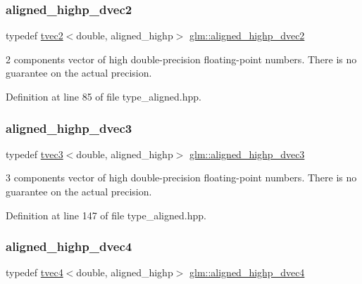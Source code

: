 \subsubsection{\texorpdfstring{aligned\_highp\_dvec2}{aligned\_highp\_dvec2}}
{\footnotesize\ttfamily typedef \mbox{\hyperlink{structglm_1_1tvec2}{tvec2}}$<$double, aligned\+\_\+highp$>$ \mbox{\hyperlink{group__gtc__type__aligned_gaaaaceecde7bb178eebc873836c7e6009}{glm\+::aligned\+\_\+highp\+\_\+dvec2}}}

2 components vector of high double-\/precision floating-\/point numbers. There is no guarantee on the actual precision. 

Definition at line 85 of file type\+\_\+aligned.\+hpp.

\mbox{\label{group__gtc__type__aligned_ga8f0cf063fb87e4bd3a26ec242a71d75d}} 
\subsubsection{\texorpdfstring{aligned\_highp\_dvec3}{aligned\_highp\_dvec3}}
{\footnotesize\ttfamily typedef \mbox{\hyperlink{structglm_1_1tvec3}{tvec3}}$<$double, aligned\+\_\+highp$>$ \mbox{\hyperlink{group__gtc__type__aligned_ga8f0cf063fb87e4bd3a26ec242a71d75d}{glm\+::aligned\+\_\+highp\+\_\+dvec3}}}

3 components vector of high double-\/precision floating-\/point numbers. There is no guarantee on the actual precision. 

Definition at line 147 of file type\+\_\+aligned.\+hpp.

\mbox{\label{group__gtc__type__aligned_ga96f78b78823a228d1ca0cfa3be7e6a64}} 
\subsubsection{\texorpdfstring{aligned\_highp\_dvec4}{aligned\_highp\_dvec4}}
{\footnotesize\ttfamily typedef \mbox{\hyperlink{structglm_1_1tvec4}{tvec4}}$<$double, aligned\+\_\+highp$>$ \mbox{\hyperlink{group__gtc__type__aligned_ga96f78b78823a228d1ca0cfa3be7e6a64}{glm\+::aligned\+\_\+highp\+\_\+dvec4}}}




